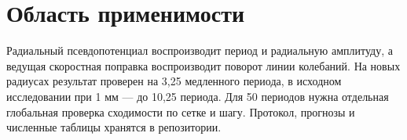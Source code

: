 \documentclass[11pt,a4paper]{article}
\begin{document}
\section*{Область применимости}
Радиальный псевдопотенциал воспроизводит период и радиальную амплитуду,
а ведущая скоростная поправка воспроизводит поворот линии колебаний.
На новых радиусах результат проверен на 3,25 медленного периода, в исходном
исследовании при 1 мм --- до 10,25 периода. Для 50 периодов нужна отдельная
глобальная проверка сходимости по сетке и шагу.
Протокол, прогнозы и численные таблицы хранятся в репозитории.
\end{document}
